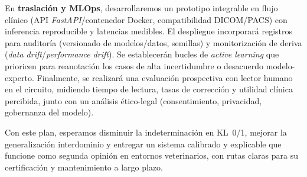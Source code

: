 \documentclass[11pt,spanish,listoffigures,listoftables]{tfgetsinf}
\begin{document}
En \textbf{traslación y MLOps}, desarrollaremos un prototipo integrable en flujo clínico (API \emph{FastAPI}/contenedor Docker, compatibilidad DICOM/PACS) con inferencia reproducible y latencias medibles. El despliegue incorporará registros para auditoría (versionado de modelos/datos, semillas) y monitorización de deriva (\emph{data drift}/\emph{performance drift}). Se establecerán bucles de \emph{active learning} que prioricen para reanotación los casos de alta incertidumbre o desacuerdo modelo-experto. Finalmente, se realizará una evaluación prospectiva con lector humano en el circuito, midiendo tiempo de lectura, tasas de corrección y utilidad clínica percibida, junto con un análisis ético-legal (consentimiento, privacidad, gobernanza del modelo).

Con este plan, esperamos disminuir la indeterminación en KL~0/1, mejorar la generalización interdominio y entregar un sistema calibrado y explicable que funcione como segunda opinión en entornos veterinarios, con rutas claras para su certificación y mantenimiento a largo plazo.


\printbibliography
\cleardoublepage

\appendix

\end{document}
